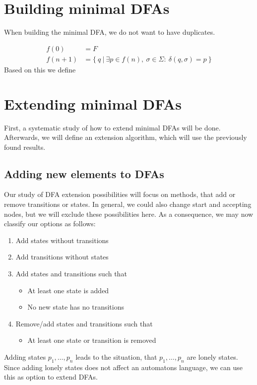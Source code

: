 \documentclass[a4paper, oneside, 11pt]{report}
\theoremstyle{definition}
\theoremstyle{remark}
\begin{document}
\chapter{Building minimal DFAs}

When building the minimal DFA, we do not want to have duplicates.

\begin{align*}
	f(0) &= F \\
	f(n + 1) &= \{\ q\ |\ \exists p\in f(n),\ \sigma\in\Sigma\colon\ \delta(q,\sigma) = p\ \}
\end{align*}
Based on this we define

\chapter{Extending minimal DFAs}

First, a systematic study of how to extend minimal DFAs will be done. Afterwards, we will define an extension algorithm, which will use the previously found results.

\section{Adding new elements to DFAs}

Our study of DFA extension possibilities will focus on methods, that add or remove transitions or states. In general, we could also change start and accepting nodes, but we will exclude these possibilities here. As a consequence, we may now classify our options as follows:
\begin{enumerate}
	\item Add states without transitions
	\item Add transitions without states
	\item Add states and transitions such that
	\begin{itemize}
		\item At least one state is added
		\item No new state has no transitions
	\end{itemize}
	\item Remove/add states and transitions such that
	\begin{itemize}
		\item At least one state or transition is removed
	\end{itemize}
\end{enumerate}
Adding states $p_1, \ldots, p_n$ leads to the situation, that $p_1, \ldots, p_n$ are lonely states. Since adding lonely states does not affect an automatons language, we can use this as option to extend DFAs.
\end{document}
